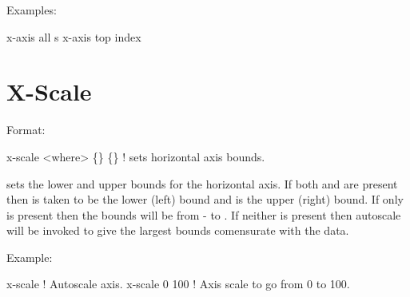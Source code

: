 Examples:
\begin{example}
  x-axis all s
  x-axis top index
\end{example}

\section{X-Scale}
\label{s:x-scale}

Format:
\begin{example}
  x-scale <where> \{<bound1>\} \{<bound2>\}  ! sets horizontal axis bounds.
\end{example}

\vskip 0.2in 
 sets the lower and upper bounds for the horizontal axis.
If both  and  are present then 
is taken to be the lower (left) bound and  is the upper
(right) bound. If only  is present then the bounds will
be from - to . If neither is present then
autoscale will be invoked to give the largest bounds comensurate with
the data.

Example:
\begin{example}
  x-scale        ! Autoscale axis.
  x-scale 0 100  ! Axis scale to go from 0 to 100.
\end{example}

